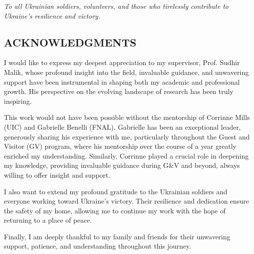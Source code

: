 


\vspace*{2in}
\begin{center}
	\emph{To all Ukrainian soldiers, volunteers, and those who tirelessly contribute to Ukraine’s resilience and victory.}
\end{center}

\newpage


\vspace*{0.5in}
\begin{center}
	\section*{ACKNOWLEDGMENTS}
\end{center}


\noindent I would like to express my deepest appreciation to my supervisor, Prof. Sudhir Malik, whose profound insight into the field, invaluable guidance, and unwavering support have been instrumental in shaping both my academic and professional growth. His perspective on the evolving landscape of research has been truly inspiring.

This work would not have been possible without the mentorship of Corrinne Mills (UIC) and Gabrielle Benelli (FNAL). Gabrielle has been an exceptional leader, generously sharing his experience with me, particularly throughout the Guest and Visitor (GV) program, where his mentorship over the course of a year greatly enriched my understanding. Similarly, Corrinne played a crucial role in deepening my knowledge, providing invaluable guidance during G\&V and beyond, always willing to offer insight and support.

I also want to extend my profound gratitude to the Ukrainian soldiers and everyone working toward Ukraine’s victory. Their resilience and dedication ensure the safety of my home, allowing me to continue my work with the hope of returning to a place of peace.

Finally, I am deeply thankful to my family and friends for their unwavering support, patience, and understanding throughout this journey.
\newline
\noindent
